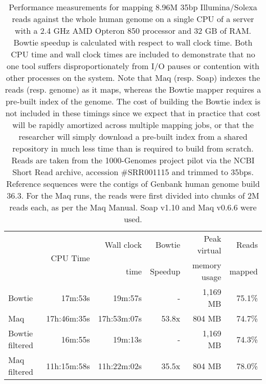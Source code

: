 \documentclass[letterpaper]{article}
\begin{document}
\begin{table}[tp]
\scriptsize
\begin{tabular}{lrrrrr}
\toprule
 & \multirow{2}{*}{CPU Time} & Wall clock & Bowtie  & Peak virtual & Reads  \\
 &                            & time       & Speedup & memory usage & mapped \\[3pt]
\toprule
\midrule
Bowtie & 17m:53s & 19m:57s & - & 1,169 MB & 75.1\%\\\midrule
Maq & 17h:46m:35s & 17h:53m:07s & 53.8x & 804 MB & 74.7\%\\\midrule
Bowtie filtered & 16m:55s & 19m:13s & - & 1,169 MB & 74.3\%\\\midrule
Maq filtered & 11h:15m:58s & 11h:22m:02s & 35.5x & 804 MB & 78.0\%\\
\bottomrule
\end{tabular}
\caption{Performance measurements for mapping 8.96M 35bp Illumina/Solexa reads against the whole human genome on a single CPU of a server with a 2.4 GHz AMD Opteron 850 processor and 32 GB of RAM. Bowtie speedup is calculated with respect to wall clock time. Both CPU time and wall clock times are included to demonstrate that no one tool suffers disproportionately from I/O pauses or contention with other processes on the system. Note that Maq (resp. Soap) indexes the reads (resp. genome) as it maps, whereas the Bowtie mapper requires a pre-built index of the genome.  The cost of building the Bowtie index is not included in these timings since we expect that in practice that cost will be rapidly amortized across multiple mapping jobs, or that the researcher will simply download a pre-built index from a shared repository in much less time than is required to build from scratch. Reads are taken from the 1000-Genomes project pilot via the NCBI Short Read archive, accession \#SRR001115 and trimmed to 35bps. Reference sequences were the contigs of Genbank human genome build 36.3. For the Maq runs, the reads were first divided into chunks of 2M reads each, as per the Maq Manual. Soap v1.10 and Maq v0.6.6 were used. }
\end{table}
\end{document}

